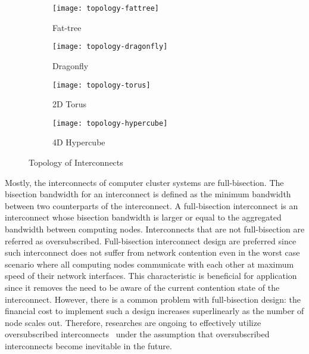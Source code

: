 \begin{figure}
    \centering
    \begin{subfigure}{.45\linewidth}
        \centering
        \texttt{[image: topology-fattree]}
        \caption{Fat-tree}%
        \label{fig:topology-fattree}
    \end{subfigure}
    \begin{subfigure}{.45\linewidth}
        \centering
        \texttt{[image: topology-dragonfly]}
        \caption{Dragonfly}%
        \label{fig:topology-dragonfly}
    \end{subfigure}
    \par\bigskip
    \begin{subfigure}{.45\linewidth}
        \centering
        \texttt{[image: topology-torus]}
        \caption{2D Torus}%
        \label{fig:topology-torus}
    \end{subfigure}
    \begin{subfigure}{.45\linewidth}
        \centering
        \texttt{[image: topology-hypercube]}
        \caption{4D Hypercube}%
        \label{fig:topology-hypercube}
    \end{subfigure}
    \caption{Topology of Interconnects}%
    \label{fig:topology}
\end{figure}


Mostly, the interconnects of computer cluster systems are full-bisection.
The bisection bandwidth for an interconnect is defined as the minimum
bandwidth between two counterparts of the interconnect. A full-bisection
interconnect is an interconnect whose bisection bandwidth is larger or equal
to the aggregated bandwidth between computing nodes. Interconnects that are
not full-bisection are referred as oversubscribed. Full-bisection interconnect
design are preferred since such interconnect does not suffer from network
contention even in the worst case scenario where all computing nodes
communicate with each other at maximum speed of their network interfaces. This
characteristic is beneficial for application since it removes the need to be
aware of the current contention state of the interconnect. However, there is a
common problem with full-bisection design: the financial cost to implement
such a design increases superlinearly as the number of node scales out.
Therefore, researches are ongoing to effectively utilize oversubscribed
interconnects~\autocite{Leon2017,Michelogiannakis2017} under the assumption
that oversubscribed interconnects become inevitable in the future.

